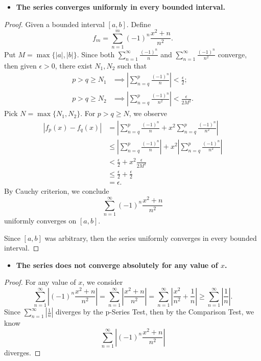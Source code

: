 \begin{Exercise}
	\begin{itemize}
		\item \textbf{The series converges uniformly in every bounded interval.}
	\end{itemize}
	\begin{proof}
		Given a bounded interval $[a,b]$.
		Define
		$$
		f_m = \sum_{n=1}^{m}(-1)^n \frac{x^2+n}{n^2}.
		$$
		Put $M = \max\{|a|, |b|\}$.
		Since both $\sum_{n=1}^{\infty}\frac{(-1)^n}{n}$ and $\sum_{n=1}^{\infty} \frac{(-1)^n}{n^2}$ converge, then given $\epsilon > 0$, there exist $N_1,N_2$ such that
		\begin{align*}
		p>q\geq N_1 &\implies \left| \sum_{n=q}^{p}\frac{(-1)^n}{n}\right| < \frac{\epsilon}{2}; \\
		p>q\geq N_2 &\implies \left| \sum_{n=q}^{p}\frac{(-1)^n}{n^2}\right| < \frac{\epsilon}{2 M^2}.
		\end{align*}
		Pick $N = \max\{N_1, N_2\}$.
		For $p > q \geq N$, we observe
		\begin{align*}
		\left| f_p(x) - f_q(x) \right|
		&= \left| \sum_{n=q}^{p}\frac{(-1)^n}{n} + x^2 \sum_{n=q}^{p}\frac{(-1)^n}{n^2} \right| \\
		&\leq \left| \sum_{n=q}^{p}\frac{(-1)^n}{n} \right| + x^2 \left| \sum_{n=q}^{p}\frac{(-1)^n}{n^2} \right| \\
		&< \frac{\epsilon}{2} + x^2 \frac{\epsilon}{2 M^2} \\
		&\leq \frac{\epsilon}{2} + \frac{\epsilon}{2} \\
		&= \epsilon.
		\end{align*}
		By Cauchy criterion, we conclude
		$$
		\sum_{n=1}^{\infty}(-1)^n \frac{x^2+n}{n^2}
		$$
		uniformly converges on $[a,b]$.
		
		Since $[a,b]$ was arbitrary, then the series uniformly converges in every bounded interval.
	\end{proof}
	
	\begin{itemize}
		\item \textbf{The series does not converge absolutely for any value of $x$.}
	\end{itemize}
	\begin{proof}
		For any value of $x$, we consider
		$$
		\sum_{n=1}^{\infty} \left| (-1)^n \frac{x^2+n}{n^2} \right|
		= \sum_{n=1}^{\infty} \left| \frac{x^2+n}{n^2} \right|
		= \sum_{n=1}^{\infty} \left| \frac{x^2}{n^2} + \frac{1}{n} \right|
		\geq \sum_{n=1}^{\infty} \left| \frac{1}{n} \right|.
		$$
		Since $\sum_{n=1}^{\infty} \left| \frac{1}{n} \right|$ diverges by the p-Series Test, then by the Comparison Test, we know
		$$
		\sum_{n=1}^{\infty} \left| (-1)^n \frac{x^2+n}{n^2} \right|
		$$
		diverges.
	\end{proof}
\end{Exercise}